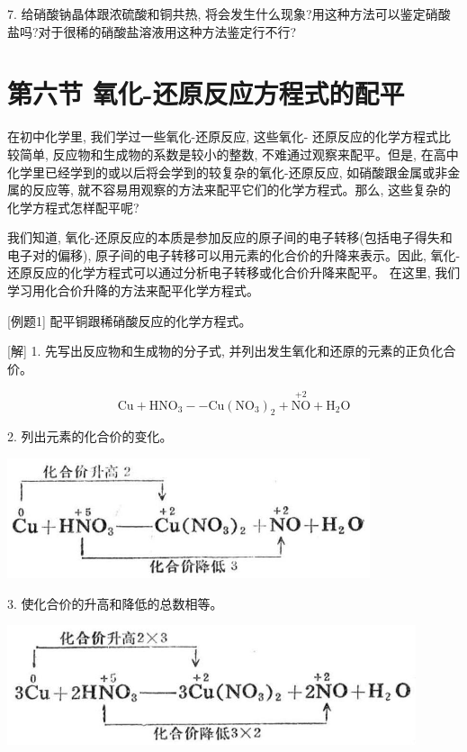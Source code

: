 \documentclass[10pt]{article}
\begin{document}
7. 给硝酸钠晶体跟浓硫酸和铜共热, 将会发生什么现象?用这种方法可以鉴定硝酸盐吗?对于很稀的硝酸盐溶液用这种方法鉴定行不行?

\section*{第六节 氧化-还原反应方程式的配平}

在初中化学里, 我们学过一些氧化-还原反应, 这些氧化- 还原反应的化学方程式比较简单, 反应物和生成物的系数是较小的整数, 不难通过观察来配平。但是, 在高中化学里已经学到的或以后将会学到的较复杂的氧化-还原反应, 如硝酸跟金属或非金属的反应等, 就不容易用观察的方法来配平它们的化学方程式。那么, 这些复杂的化学方程式怎样配平呢?

我们知道, 氧化-还原反应的本质是参加反应的原子间的电子转移(包括电子得失和电子对的偏移), 原子间的电子转移可以用元素的化合价的升降来表示。因此, 氧化-还原反应的化学方程式可以通过分析电子转移或化合价升降来配平。 在这里, 我们学习用化合价升降的方法来配平化学方程式。

[例题1] 配平铜跟稀硝酸反应的化学方程式。

[解] 1. 先写出反应物和生成物的分子式, 并列出发生氧化和还原的元素的正负化合价。

\[
\mathrm{{Cu}} + {\mathrm{{HNO}}}_{3} - - \mathrm{{Cu}}{\left( {\mathrm{{NO}}}_{3}\right) }_{2} + \overset{+2}{\mathrm{{NO}}} + {\mathrm{H}}_{2}\mathrm{O}
\]

2. 列出元素的化合价的变化。

\begin{center}
\includegraphics[max width=0.8\textwidth]{images/01912d13-9986-7822-a012-3f3f7be99dcb_55_983090.jpg}
\end{center}

3. 使化合价的升高和降低的总数相等。

\begin{center}
\includegraphics[max width=0.9\textwidth]{images/01912d13-9986-7822-a012-3f3f7be99dcb_55_289451.jpg}
\end{center}
\end{document}
